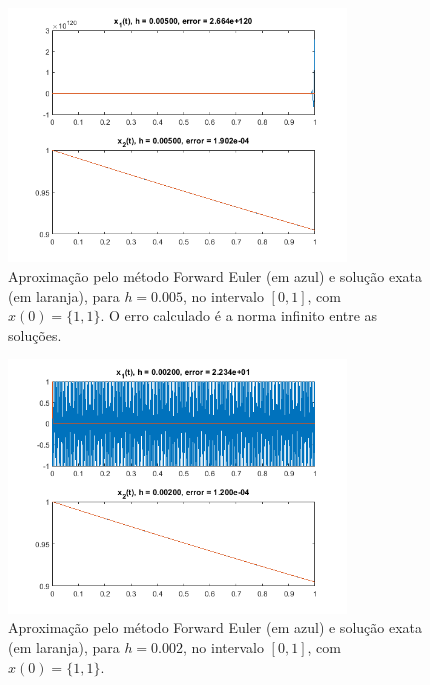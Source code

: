 \documentclass{article}
\begin{document}
\begin{enumerate}
\begin{enumerate}
                    \begin{figure}[!h]
                        \centering
                        \includegraphics[width=0.8\textwidth]{forward_1.png}
                        \caption{Aproximação pelo método Forward Euler (em azul) e
                        solução exata (em laranja), para $h = 0.005$,
                        no intervalo $[0, 1]$, com $x(0) = \{1, 1\}$.
                        O erro calculado é a norma infinito entre as
                        soluções.}
                        \label{fig:forward_1}
                    \end{figure}
                    
                    \begin{figure}[!h]
                        \centering
                        \includegraphics[width=0.8\textwidth]{forward_2.png}
                        \caption{Aproximação pelo método Forward Euler (em azul) e
                        solução exata (em laranja), para $h = 0.002$,
                        no intervalo $[0, 1]$, com $x(0) = \{1, 1\}$.}
                        \label{fig:forward_2}
                    \end{figure}
                    

\end{enumerate}
\end{enumerate}
\end{document}

